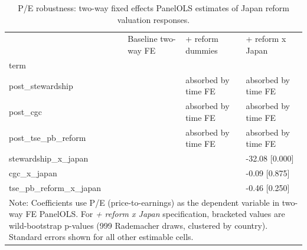 \begin{table}
\caption{P/E robustness: two-way fixed effects PanelOLS estimates of Japan reform valuation responses.}
\label{tab:robustness_pe_panel_ols}
\begin{tabular}{llll}
\toprule
 & Baseline two-way FE & + reform dummies & + reform x Japan \\
term &  &  &  \\
\midrule
post_stewardship &  & absorbed by time FE & absorbed by time FE \\
post_cgc &  & absorbed by time FE & absorbed by time FE \\
post_tse_pb_reform &  & absorbed by time FE & absorbed by time FE \\
stewardship_x_japan &  &  & -32.08 [0.000] \\
cgc_x_japan &  &  & -0.09 [0.875] \\
tse_pb_reform_x_japan &  &  & -0.46 [0.250] \\
\multicolumn{4}{l}{\footnotesize Note: Coefficients use P/E (price-to-earnings) as the dependent variable in two-way FE PanelOLS. For \textit{+ reform x Japan} specification, bracketed values are wild-bootstrap p-values (999 Rademacher draws, clustered by country). Standard errors shown for all other estimable cells.} \\
\bottomrule
\end{tabular}
\end{table}
